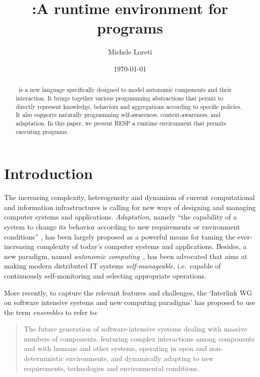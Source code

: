 \documentclass[11pt]{article}
\title{\resp{}:A runtime environment for \SCEL{} programs}
\author{Michele Loreti}
\date{\today}
\newcommand{\resp}{\textsf{RESP}}
\begin{document}
\maketitle

\begin{abstract}
\SCEL\ is a new language specifically designed to model autonomic components and their interaction. It brings together various programming abstractions that permit to directly represent knowledge, behaviors and aggregations according to specific policies. It also supports naturally programming self-awareness, context-awareness, and adaptation. 
In this paper, we present \resp{} a runtime environment that permits executing \SCEL{} programs. 
\end{abstract}

\tableofcontents

\newpage
\section{Introduction}

The increasing complexity, heterogeneity and dynamism of current computational and information infrastructures is calling for new ways of designing and managing computer systems and applications. \emph{Adaptation}, namely ``the capability of a system to change its behavior according to new requirements or environment conditions'' \cite{HRW08}, has been largely proposed as a powerful means for taming the ever-increasing complexity of today's computer systems and applications. Besides, a new paradigm, named \emph{autonomic computing}~\cite{IBM05}, has been advocated that aims at making modern distributed IT systems \emph{self-manageable}, i.e.\ capable of continuously self-monitoring and selecting appropriate operations.

More recently, to capture the relevant features and challenges, the `Interlink WG on software intensive systems and new computing paradigms' \cite{InterLink} has proposed to use the term \emph{ensembles} to refer to:
\begin{quote}
The future generation of software-intensive systems dealing with massive numbers of components, featuring complex interactions among components and with humans and other systems, operating in open and non-deterministic environments, and dynamically adapting to new requirements, technologies and environmental conditions.
\end{quote}
\end{document}
